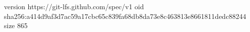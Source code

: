 version https://git-lfs.github.com/spec/v1
oid sha256:a414d9af3d7ac59a17cbc65c839fa68db8da73e8c463813e8661811dedc88244
size 865
